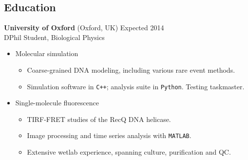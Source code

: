 \documentclass[margin]{res}
\newcommand{\locdatesubsection}[3]{\textbf{#1} (#2) \hfill #3}
\begin{document}
 
\begin{sloppypar}
 
 
\address{2115 Cloville Avenue\\
         Baltimore, MD 21214\\
         +1 443 257 5953}
\address{\\ryan.m.harrison@gmail.com\\}
\address{Wolfson College\\ 
         Oxford OX2 6UD\\
         +44 07523 229446}
 
\begin{resume} 
\setlength{\parskip}{2.5ex}
\setlength{\parindent}{0pt}
 
\section{Education} 
\locdatesubsection{University of Oxford}{Oxford, UK}{Expected 2014}\\
DPhil Student, Biological Physics %

\begin{itemize}
\item Molecular simulation
    \begin{itemize}
    \item Coarse-grained DNA modeling, including various rare event methods.
    \item Simulation software in \texttt{C++}; analysis suite in \texttt{Python}. Testing taskmaster.
    \end{itemize}
\item Single-molecule fluorescence
    \begin{itemize}
    \item \textsc{TIRF-FRET} studies of the RecQ DNA helicase.
    \item Image processing and time series analysis with \textsc{\texttt{MATLAB}}. 
    \item Extensive wetlab experience, spanning culture, purification and QC.
    \end{itemize}
\end{itemize}


\end{resume}
\end{sloppypar}
\end{document}
